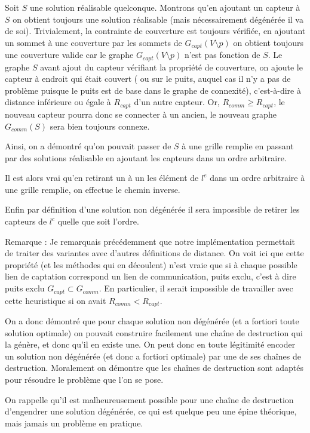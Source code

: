 \documentclass[12pt,a4paper]{article}
\begin{document}
Soit $S$ une solution réalisable quelconque. Montrons qu'en ajoutant un capteur à $S$ on obtient toujours une solution réalisable (mais nécessairement dégénérée il va de soi). Trivialement, la contrainte de couverture est toujours vérifiée, en ajoutant un sommet à une couverture par les sommets de $G_{capt}(V\setminus p)$ on obtient toujours une couverture valide car le graphe $G_{capt}(V\setminus p)$ n'est pas fonction de $S$. Le graphe $S$ avant ajout du capteur vérifiant la propriété de couverture, on ajoute le capteur à endroit qui était couvert ( ou sur le puits, auquel cas il n'y a pas de problème puisque le puits est de base dans le graphe de connexité), c'est-à-dire à distance inférieure ou égale à $R_{capt}$ d'un autre capteur. Or, $R_{comm}\geq R_{capt}$, le nouveau capteur pourra donc se connecter à un ancien, le nouveau graphe $G_{comm}(S)$ sera bien toujours connexe.


Ainsi, on a démontré qu'on pouvait passer de $S$ à une grille remplie en passant par des solutions réalisable en ajoutant les capteurs dans un ordre arbitraire.

Il est alors vrai qu'en retirant un à un les élément de $l^e$ dans un ordre arbitraire à une grille remplie, on effectue le chemin inverse.

Enfin par définition d'une solution non dégénérée il sera impossible de retirer les capteurs de $l^c$ quelle que soit l'ordre.

Remarque : Je remarquais précédemment que notre implémentation permettait de traiter des variantes avec d'autres définitions de distance. On voit ici que cette propriété (et les méthodes qui en découlent) n'est vraie que si à chaque possible lien de captation correspond un lien de communication, puits exclu, c'est à dire puits exclu $G_{capt}\subset G_{comm}$. En particulier, il serait impossible de travailler avec cette heuristique si on avait $R_{comm}<R_{capt}$.

On a donc démontré que pour chaque solution non dégénérée (et a fortiori toute solution optimale) on pouvait construire facilement une chaîne de destruction qui la génère, et donc qu'il en existe une. On peut donc en toute légitimité encoder un solution non dégénérée (et donc a fortiori optimale) par une de ses chaînes de destruction. Moralement on démontre que les chaînes de destruction sont adaptés pour résoudre le problème que l'on se pose.  

On rappelle qu'il est malheureusement possible pour une chaîne de destruction d'engendrer une solution dégénérée, ce qui est quelque peu une épine théorique, mais jamais un problème en pratique.
\end{document}

